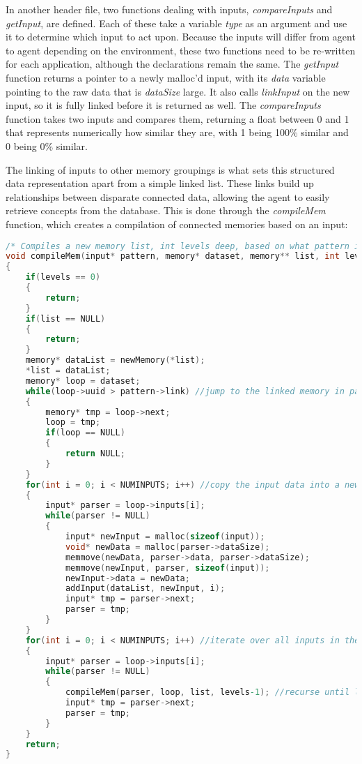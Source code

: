 \documentclass{report}
\begin{document}
In another header file, two functions dealing with inputs, \textit{compareInputs} and \textit{getInput}, are defined. Each of these take a variable \textit{type} as an argument and use it to determine which input to act upon. Because the inputs will differ from agent to agent depending on the environment, these two functions need to be re-written for each application, although the declarations remain the same. The \textit{getInput} function returns a pointer to a newly malloc'd input, with its \textit{data} variable pointing to the raw data that is \textit{dataSize} large. It also calls \textit{linkInput} on the new input, so it is fully linked before it is returned as well. The \textit{compareInputs} function takes two inputs and compares them, returning a float between 0 and 1 that represents numerically how similar they are, with 1 being 100\% similar and 0 being 0\% similar. 

The linking of inputs to other memory groupings is what sets this structured data representation apart from a simple linked list. These links build up relationships between disparate connected data, allowing the agent to easily retrieve concepts from the database. This is done through the \textit{compileMem} function, which creates a compilation of connected memories based on an input: 
\lstset{style=ccode}
\begin{lstlisting}[language=C]
/* Compiles a new memory list, int levels deep, based on what pattern is linked to. Dataset should point to the database, and list should point to a NULL memory pointer, that the composite will eventually be stored in. */
void compileMem(input* pattern, memory* dataset, memory** list, int levels)
{
    if(levels == 0)
    {
        return;
    }
    if(list == NULL)
    {
        return;
    }
    memory* dataList = newMemory(*list);
    *list = dataList;
    memory* loop = dataset;
    while(loop->uuid > pattern->link) //jump to the linked memory in pattern
    {
        memory* tmp = loop->next;
        loop = tmp;
        if(loop == NULL)
        {
            return NULL;
        }
    }
    for(int i = 0; i < NUMINPUTS; i++) //copy the input data into a new list
    {
        input* parser = loop->inputs[i];
        while(parser != NULL)
        {
            input* newInput = malloc(sizeof(input));
            void* newData = malloc(parser->dataSize);
            memmove(newData, parser->data, parser->dataSize);
            memmove(newInput, parser, sizeof(input));
            newInput->data = newData;
            addInput(dataList, newInput, i);
            input* tmp = parser->next;
            parser = tmp;
        }
    }
    for(int i = 0; i < NUMINPUTS; i++) //iterate over all inputs in the memory
    {
        input* parser = loop->inputs[i];
        while(parser != NULL)
        {
            compileMem(parser, loop, list, levels-1); //recurse until levels reaches 0
            input* tmp = parser->next;
            parser = tmp;
        }
    }
    return;
}
\end{lstlisting}
\end{document}

